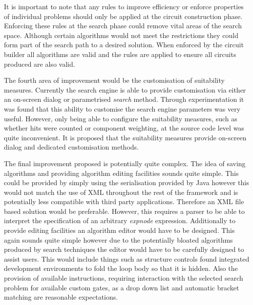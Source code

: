 It is important to note that any rules to improve efficiency or enforce properties of individual problems should only be applied at the circuit construction phase.
Enforcing these rules at the search phase could remove vital areas of the search space.
Although certain algorithms would not meet the restrictions they could form part of the search path to a desired solution.
When enforced by the circuit builder all algorithms are valid and the rules are applied to ensure all circuits produced are also valid.

The fourth area of improvement would be the customisation of suitability measures.
Currently the search engine is able to provide customisation via either an on-screen dialog or parametrised \emph{search} method.
Through experimentation it was found that this ability to customise the search engine parameters was very useful.
However, only being able to configure the suitability measures, such as whether hits were counted or component weighting, at the source code level was quite inconvenient.
It is proposed that the suitability measures provide on-screen dialog and dedicated customisation methods.

The final improvement proposed is potentially quite complex.
The idea of saving algorithms and providing algorithm editing facilities sounds quite simple.
This could be provided by simply using the serialisation provided by Java however this would not match the use of XML throughout the rest of the framework and is potentially less compatible with third party applications.
Therefore an XML file based solution would be preferable.
However, this requires a parser to be able to interpret the specification of an arbitrary \emph{expnode} expression.
Additionally to provide editing facilities an algorithm editor would have to be designed.
This again sounds quite simple however due to the potentially bloated algorithms produced by search techniques the editor would have to be carefully designed to assist users.
This would include things such as structure controls found integrated development environments to fold the loop body so that it is hidden.
Also the provision of available instructions, requiring interaction with the selected search problem for available custom gates, as a drop down list and automatic bracket matching are reasonable expectations.

